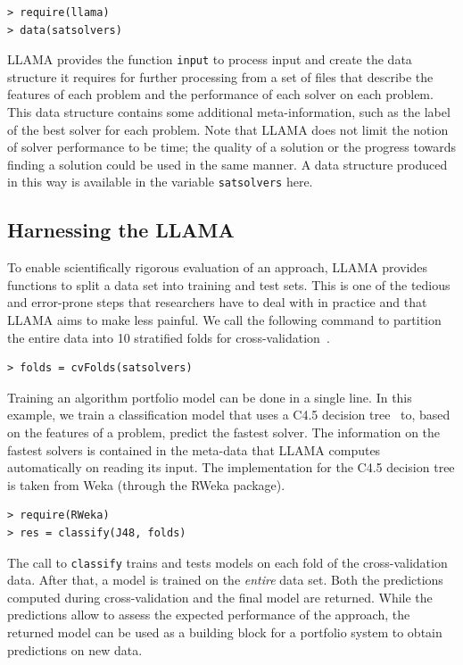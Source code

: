 \documentclass{llncs}
\begin{document}
\begin{verbatim}
> require(llama)
> data(satsolvers)
\end{verbatim}

LLAMA provides the function \verb+input+ to process input and create the data
structure it requires for further processing from a set of files that describe
the features of each problem and the performance of each solver on each problem.
This data structure contains some additional meta-information, such as the label
of the best solver for each problem. Note that LLAMA does not limit the notion
of solver performance to be time; the quality of a solution or the progress
towards finding a solution could be used in the same manner. A data structure
produced in this way is available in the variable \verb+satsolvers+ here.

\subsection{Harnessing the LLAMA}

To enable scientifically rigorous evaluation of an approach, LLAMA provides
functions to split a data set into training and test sets. This is one of the
tedious and error-prone steps that researchers have to deal with in practice and
that LLAMA aims to make less painful. We call the following command to partition
the entire data into 10 stratified folds for
cross-validation~\cite{kohavi_study_1995}.

\begin{verbatim}
> folds = cvFolds(satsolvers)
\end{verbatim}

Training an algorithm portfolio model can be done in a single line. In this
example, we train a classification model that uses a C4.5 decision
tree~\cite{quinlan_c4.5_1993} to, based on the features of a problem, predict
the fastest solver. The information on the fastest solvers is contained in the
meta-data that LLAMA computes automatically on reading its input. The
implementation for the C4.5 decision tree is taken from Weka (through the RWeka
package).

\begin{verbatim}
> require(RWeka)
> res = classify(J48, folds)
\end{verbatim}

The call to \verb+classify+ trains and tests models on each fold of the
cross-validation data. After that, a model is trained on the \emph{entire} data
set. Both the predictions computed during cross-validation and the final model
are returned. While the predictions allow to assess the expected performance of
the approach, the returned model can be used as a building block for a portfolio
system to obtain predictions on new data.
\end{document}
